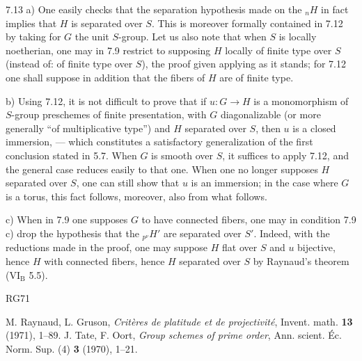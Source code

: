 \begin{remark}{7.13}\label{VIII.7.13}
a) One easily checks that the separation hypothesis made on the ${}_nH$ in fact implies that $H$ is separated over $S$. This is moreover formally contained in 7.12 by taking for $G$ the unit $S$-group. Let us also note that when $S$ is locally noetherian, one may in 7.9 restrict to supposing $H$ locally of finite type over $S$ (instead of: of finite type over $S$), the proof given applying as it stands; for 7.12 one shall suppose in addition that the fibers of $H$ are of finite type.

b) Using 7.12, it is not difficult to prove that if $u:G\to H$ is a monomorphism of $S$-group preschemes of finite presentation, with $G$ diagonalizable (or more generally ``of multiplicative type'') and $H$ separated over $S$, then $u$ is a closed immersion, --- which constitutes a satisfactory generalization of the first conclusion stated in 5.7. When $G$ is smooth over $S$, it suffices to apply 7.12, and the general case reduces easily to that one. When one no longer supposes $H$ separated over $S$, one can still show that $u$ is an immersion; in the case where $G$ is a torus, this fact follows, moreover, also from what follows.

c) When in 7.9 one supposes $G$ to have connected fibers, one may in condition 7.9 c) drop the hypothesis that the ${}_{p^\nu}H'$ are separated over $S'$. Indeed, with the reductions made in the proof, one may suppose $H$ flat over $S$ and $u$ bijective, hence $H$ with connected fibers, hence $H$ separated over $S$ by Raynaud's theorem (VI$_{\mathrm B}$ 5.5).
\end{remark}
\begin{thebibliography}{RG71}
\item[]
 M. Raynaud, L. Gruson, \emph{Critères de platitude et de projectivité}, Invent. math. \textbf{13} (1971), 1--89.
 J. Tate, F. Oort, \emph{Group schemes of prime order}, Ann. scient. Éc. Norm. Sup. (4) \textbf{3} (1970), 1--21.
\end{thebibliography}
